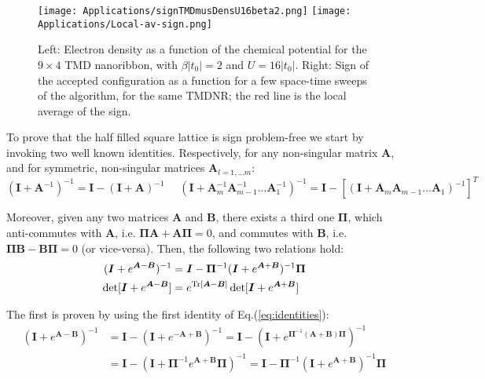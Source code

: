 \begin{figure}[H]
\texttt{[image: Applications/signTMDmusDensU16beta2.png]}
\texttt{[image: Applications/Local-av-sign.png]}
	\caption[Electron density as a function of the chemical potential for the $9 \times 4$ \acs{TMD} nanoribbon, with $\beta |t_0| = 2$ and $U = 16|t_0|$. Sign of the accepted configuration as a function for a few space-time sweeps of the algorithm.]{Left: Electron density as a function of the chemical potential for the $9 \times 4$ \acs{TMD} nanoribbon, with $\beta |t_0| =2$ and $U = 16|t_0|$.
	Right: Sign of the accepted configuration as a function for a few space-time sweeps of the algorithm, for the same \acs{TMDNR}; the red line is the local average of the sign.}
	\label{fig:SignLoc}
\end{figure}

To prove that the half filled square lattice is sign problem-free we start by invoking two well known identities.
Respectively, for any non-singular matrix $\bm A$, and for symmetric, non-singular matrices $\bm A_{l=1,... m}$:
\begin{equation}\label{eq:identities}
( \bm I + \bm A^{-1} )^{-1}  = \bm I - ( \bm I + \bm A )^{-1} \,\,\,\, \,\,\,\, ( \bm I + \bm A_m^{-1}  \bm A_{m-1}^{-1}  ...  \bm A_{1}^{-1} )^{-1} =  \bm I - [ ( \bm I + \bm A_m \bm A_{m-1} ... \bm A_1 )^{-1} ]^T
\end{equation}

Moreover, given any two matrices $\bm A$ and $\bm B$, there exists a third one $\bm \Pi$, which anti-commutes with $\bm A$, i.e. $ \bm \Pi \bm A  + \bm A \bm \Pi = 0$, and commutes with $\bm B$, i.e. $ \bm \Pi \bm B  - \bm B \bm \Pi = 0$ (or vice-versa).
Then, the following two relations hold:
\begin{equation}
\begin{split}
( \bm I + e^{\bm A - \bm B} )^{-1} &= \bm I - \bm \Pi^{-1} ( \bm I + e^{\bm A + \bm B} )^{-1} \bm \Pi \\
\det [ \bm I + e^{\bm A - \bm B} ] &= e^{\operatorname{Tr} [\bm A - \bm B ]} \det [ \bm I + e^{\bm A + \bm B} ]
\end{split}
\end{equation}

The first is proven by using the first identity of Eq.(\ref{eq:identities}):
\begin{equation}
\begin{split}
( \bm I + e^{\bm A - \bm B} )^{-1} &= \bm I - ( \bm I + e^{-\bm A + \bm B} )^{-1}  = \bm I - ( \bm I + e^{\bm \Pi^{-1} ( \bm A + \bm B) \bm \Pi } )^{-1} \\
&= \bm I - ( \bm I + \bm \Pi^{-1} e^{\bm A + \bm B} \bm \Pi )^{-1} = \bm I - \bm \Pi^{-1} ( \bm I + e^{\bm A + \bm B} )^{-1} \bm \Pi
\end{split}
\end{equation}

